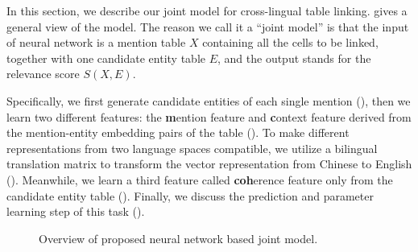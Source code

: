 
In this section, we describe our joint model for cross-lingual table linking.
 gives a general view of the model.
The reason we call it a ``joint model'' is that
the input of neural network is a mention table $X$ containing all the cells to be linked,
together with one candidate entity table $E$,
and the output stands for the relevance score $S(X, E)$.

Specifically, we first generate candidate entities of each single mention (),
then we learn two different features:
the \textbf{m}ention feature and \textbf{c}ontext feature
derived from the mention-entity embedding pairs of the table ().
To make different representations from two language spaces compatible,
we utilize a bilingual translation matrix to transform the vector representation
from Chinese to English ().
Meanwhile, we learn a third feature called \textbf{coh}erence feature
only from the candidate entity table ().
Finally, we discuss the prediction and parameter learning step of this task (). 

\begin{figure*}
	\centering
	\caption{Overview of proposed neural network based joint model.}
	\label{fig:overview}
\end{figure*}
